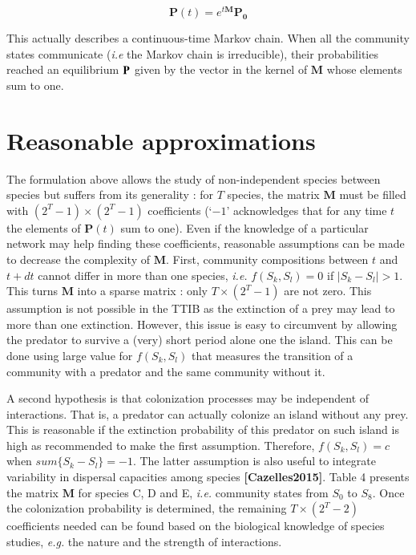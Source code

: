 \begin{equation}
\mathbf{P}(t) = e^{t\mathbf{M}}\mathbf{P_0}
\end{equation}

This actually describes a continuous-time Markov chain. When all the
community states communicate (\emph{i.e} the Markov chain is
irreducible), their probabilities reached an equilibrium
\(\mathbf{P}^{\*}\) given by the vector in the kernel of \(\mathbf{M}\)
whose elements sum to one.

\section{Reasonable approximations}\label{reasonable-approximations}

The formulation above allows the study of non-independent species
between species but suffers from its generality : for \(T\) species, the
matrix \(\mathbf{M}\) must be filled with \((2^T-1) \times (2^T-1)\)
coefficients (`\(-1\)' acknowledges that for any time \(t\) the elements
of \(\mathbf{P}(t)\) sum to one). Even if the knowledge of a particular
network may help finding these coefficients, reasonable assumptions can
be made to decrease the complexity of \(\mathbf{M}\). First, community
compositions between \(t\) and \(t+dt\) cannot differ in more than one
species, \emph{i.e.} \(f(S_k,S_l)=0\) if \(|S_k-S_l|>1\). This turns
\(\mathbf{M}\) into a sparse matrix : only \(T \times (2^T-1)\) are not
zero. This assumption is not possible in the TTIB as the extinction of a
prey may lead to more than one extinction. However, this issue is easy
to circumvent by allowing the predator to survive a (very) short period
alone one the island. This can be done using large value for
\(f(S_k,S_l)\) that measures the transition of a community with a
predator and the same community without it.

A second hypothesis is that colonization processes may be independent of
interactions. That is, a predator can actually colonize an island
without any prey. This is reasonable if the extinction probability of
this predator on such island is high as recommended to make the first
assumption. Therefore, \(f(S_k,S_l)=c\) when \(sum\{S_k-S_l\}=-1\). The
latter assumption is also useful to integrate variability in dispersal
capacities among species \textbf{{[}Cazelles2015{]}}. Table 4 presents
the matrix \(\mathbf{M}\) for species C, D and E, \emph{i.e.} community
states from \(S_0\) to \(S_8\). Once the colonization probability is
determined, the remaining \(T \times (2^T-2)\) coefficients needed can
be found based on the biological knowledge of species studies,
\emph{e.g.} the nature and the strength of interactions.

